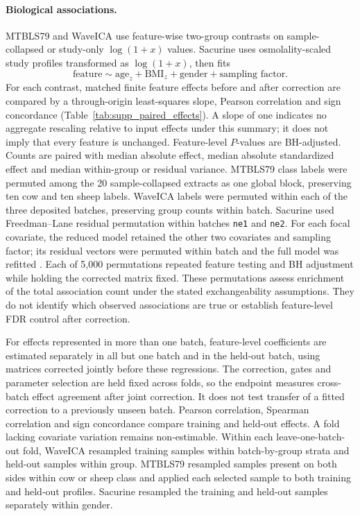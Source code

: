 \documentclass[namedate,webpdf,modern,large,nocrop]{oup-authoring-template}
\begin{document}
\paragraph{Biological associations.} MTBLS79 and WaveICA use feature-wise two-group contrasts on sample-collapsed or study-only \(\log(1+x)\) values. Sacurine uses osmolality-scaled study profiles transformed as \(\log(1+x)\), then fits
\[
\text{feature}\sim\text{age}_{z}+\text{BMI}_{z}+\text{gender}+\text{sampling factor}.
\]
For each contrast, matched finite feature effects before and after correction are compared by a through-origin least-squares slope, Pearson correlation and sign concordance (Table~\ref{tab:supp_paired_effects}). A slope of one indicates no aggregate rescaling relative to input effects under this summary; it does not imply that every feature is unchanged. Feature-level \(P\)-values are BH-adjusted. Counts are paired with median absolute effect, median absolute standardized effect and median within-group or residual variance. MTBLS79 class labels were permuted among the 20 sample-collapsed extracts as one global block, preserving ten cow and ten sheep labels. WaveICA labels were permuted within each of the three deposited batches, preserving group counts within batch. Sacurine used Freedman--Lane residual permutation within batches \texttt{ne1} and \texttt{ne2}. For each focal covariate, the reduced model retained the other two covariates and sampling factor; its residual vectors were permuted within batch and the full model was refitted \citep{FreedmanLane1983}. Each of 5,000 permutations repeated feature testing and BH adjustment while holding the corrected matrix fixed. These permutations assess enrichment of the total association count under the stated exchangeability assumptions. They do not identify which observed associations are true or establish feature-level FDR control after correction.

For effects represented in more than one batch, feature-level coefficients are estimated separately in all but one batch and in the held-out batch, using matrices corrected jointly before these regressions. The correction, gates and parameter selection are held fixed across folds, so the endpoint measures cross-batch effect agreement after joint correction. It does not test transfer of a fitted correction to a previously unseen batch. Pearson correlation, Spearman correlation and sign concordance compare training and held-out effects. A fold lacking covariate variation remains non-estimable. Within each leave-one-batch-out fold, WaveICA resampled training samples within batch-by-group strata and held-out samples within group. MTBLS79 resampled samples present on both sides within cow or sheep class and applied each selected sample to both training and held-out profiles. Sacurine resampled the training and held-out samples separately within gender.
\end{document}
